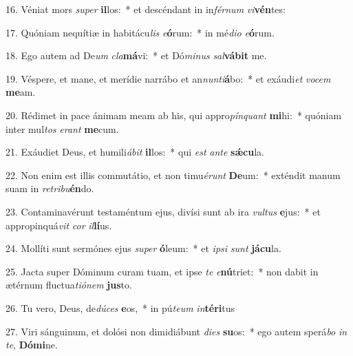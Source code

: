 16. Véniat mors \textit{su}\textit{per} \textbf{il}los:~*  et descéndant in in\textit{fér}\textit{num} \textit{vi}\textbf{vén}tes:\

17. Quóniam nequítiæ in habitácu\textit{lis} \textit{e}\textbf{ó}rum:~*  in mé\textit{di}\textit{o} \textit{e}\textbf{ó}rum.\

18. Ego autem ad De\textit{um} \textit{cla}\textbf{má}vi:~*  et Dó\textit{mi}\textit{nus} \textit{sal}\textbf{vá}\textbf{bit} me.\

19. Véspere, et mane, et merídie narrábo et an\textit{nun}\textit{ti}\textbf{á}bo:~*  et exáudi\textit{et} \textit{vo}\textit{cem} \textbf{me}am.\

20. Rédimet in pace ánimam meam ab his, qui appro\textit{pín}\textit{quant} \textbf{mi}hi:~*  quóniam inter mul\textit{tos} \textit{e}\textit{rant} \textbf{me}cum.\

21. Exáudiet Deus, et humili\textit{á}\textit{bit} \textbf{il}los:~*  qui \textit{est} \textit{an}\textit{te} \textbf{sǽ}\textbf{cu}la.\

22. Non enim est illis commutátio, et non timu\textit{é}\textit{runt} \textbf{De}um:~*  exténdit manum suam in \textit{re}\textit{tri}\textit{bu}\textbf{én}do.\

23. Contaminavérunt testaméntum ejus, divísi sunt ab ira \textit{vul}\textit{tus} \textbf{e}jus:~*  et appropinquá\textit{vit} \textit{cor} \textit{il}\textbf{lí}us.\

24. Mollíti sunt sermónes ejus \textit{su}\textit{per} \textbf{ó}leum:~*  et \textit{ip}\textit{si} \textit{sunt} \textbf{já}\textbf{cu}la.\

25. Jacta super Dóminum curam tuam, et ipse \textit{te} \textit{e}\textbf{nú}triet:~*  non dabit in ætérnum fluctua\textit{ti}\textit{ó}\textit{nem} \textbf{jus}to.\

26. Tu vero, Deus, de\textit{dú}\textit{ces} \textbf{e}os,~*  in pú\textit{te}\textit{um} \textit{in}\textbf{tér}\textbf{i}tus\

27. Viri sánguinum, et dolósi non dimidiábunt \textit{di}\textit{es} \textbf{su}os:~*  ego autem sperá\textit{bo} \textit{in} \textit{te}, \textbf{Dó}\textbf{mi}ne.\

